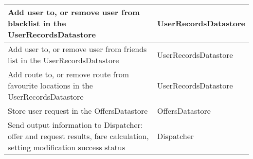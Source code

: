 \documentclass[english]{article}
\begin{document}
\begin{table}[!ht]
\begin{tabular}{|p{8cm}|p{4cm}|}
        \hline
        Add user to, or remove user from blacklist in the UserRecordsDatastore  &  UserRecordsDatastore\\
        \hline
        Add user to, or remove user from friends list in the UserRecordsDatastore  &  UserRecordsDatastore\\
        \hline
        Add route to, or remove route from favourite locations in the UserRecordsDatastore  &  UserRecordsDatastore\\
        \hline
        Store user request in the OffersDatastore & OffersDatastore\\
        \hline
        Send output information to Dispatcher: offer and request results, fare calculation, setting modification success status & Dispatcher\\
        \hline
        \end{tabular}
    \end{table} 
    
\end{document}
